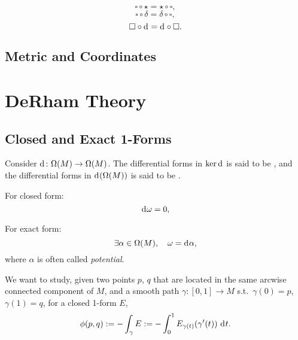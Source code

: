 \documentclass[openany, oneside, a5paper]{book}
\begin{document}
\begin{theorem}
    \begin{equation}
        \square \circ \star = \star \circ \square,
    \end{equation}
    \begin{equation}
        \square \circ \delta = \delta \circ \square,
    \end{equation}
    \begin{equation}
        \square \circ \mathop{}\!\mathrm{d}^{} = \mathop{}\!\mathrm{d}^{} \circ \square.
    \end{equation}
\end{theorem}


\section{Metric and Coordinates}

\chapter{DeRham Theory}
\section{Closed and Exact 1-Forms}

\begin{definition}
    Consider $\mathop{}\!\mathrm{d}^{} \colon \Omega(M) \to \Omega(M)$.
    The differential forms in $\ker \mathop{}\!\mathrm{d}^{}$ is said to be , and the differential forms in $\mathop{}\!\mathrm{d}^{}(\Omega(M))$ is said to be .
\end{definition}

For closed form:
\begin{equation}
    \mathop{}\!\mathrm{d}^{} \omega = 0,
\end{equation}

For exact form:
\begin{equation}
    \exists \alpha \in \Omega(M),
    \quad
    \omega = \mathop{}\!\mathrm{d}^{} \alpha,
\end{equation}
where $\alpha$ is often called \emph{potential}.



We want to study, 
given two points $p$, $q$ that are located in the same arcwise connected component of $M$, 
and a smooth path $\gamma \colon [0, 1] \to M$ s.t.\ $\gamma(0) = p$, $\gamma(1) = q$,
for a closed 1-form $E$,
\begin{equation}
    \phi(p, q) := - \int_\gamma E := - \int_0^1 E_{\gamma(t)} (\gamma'(t)) \,\mathop{}\!\mathrm{d}^{} t.
\end{equation}
\end{document}
